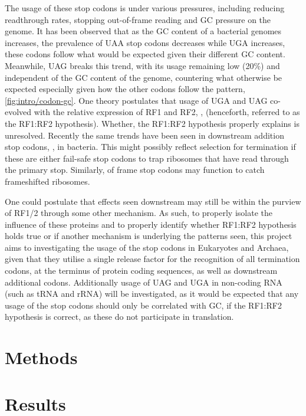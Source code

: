 \documentclass[
    emulatestandardclasses,
    parskip=half,
]{scrartcl}
\begin{document}
        The usage of these stop codons is under various pressures, including reducing readthrough rates, stopping out-of-frame reading and GC pressure on the genome. It has been observed that as the GC content of a bacterial genomes increases, the prevalence of UAA stop codons decreases while UGA increases, these codons follow what would be expected given their different GC content. Meanwhile, UAG breaks this trend, with its usage remaining low (20\%) and independent of the GC content of the genome, countering what otherwise be expected especially given how the other codons follow the pattern, \cref{fig:intro/codon-gc}. One theory postulates that usage of UGA and UAG co-evolved with the relative expression of RF1 and RF2, \mancite\autocite{Korkmaz2014}, (henceforth, referred to as the RF1:RF2 hypothesis). Whether, the RF1:RF2 hypothesis properly explains is unresolved. Recently the same trends have been seen in downstream addition stop codons, \autocite{Ho2019}, in bacteria. This might possibly reflect selection for termination if these are either fail-safe stop codons to trap ribosomes that have read through the primary stop. Similarly, of frame stop codons may function to catch frameshifted ribosomes.

        One could postulate that effects seen downstream may still be within the purview of RF1/2 through some other mechanism. As such, to properly isolate the influence of these proteins and to properly identify whether RF1:RF2 hypothesis holds true or if another mechanism is underlying the patterns seen, this project aims to investigating the usage of the stop codons in Eukaryotes and Archaea, given that they utilise a single release factor for the recognition of all termination codons, at the terminus of protein coding sequences, as well as downstream additional codons. Additionally usage of UAG and UGA in non-coding RNA (such as tRNA and rRNA) will be investigated, as it would be expected that any usage of the stop codons should only be correlated with GC, if the RF1:RF2 hypothesis is correct, as these do not participate in translation.




    \section{Methods}

    \section{Results}
\end{document}
